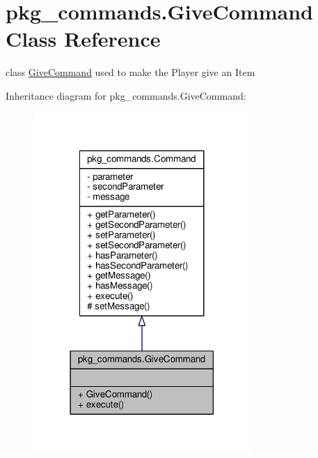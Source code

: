 \hypertarget{classpkg__commands_1_1GiveCommand}{\section{pkg\-\_\-commands.\-Give\-Command Class Reference}
\label{classpkg__commands_1_1GiveCommand}
}


class \hyperlink{classpkg__commands_1_1GiveCommand}{Give\-Command} used to make the Player give an Item  




Inheritance diagram for pkg\-\_\-commands.\-Give\-Command\-:
\nopagebreak
\begin{figure}[H]
\begin{center}
\leavevmode
\includegraphics[width=234pt]{classpkg__commands_1_1GiveCommand__inherit__graph}
\end{center}
\end{figure}


